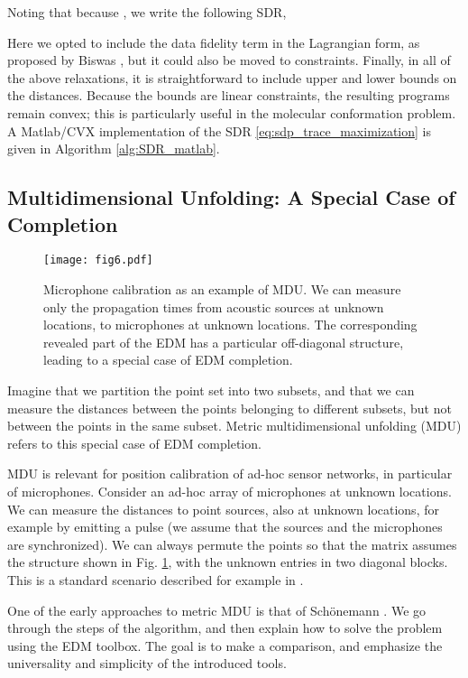 \documentclass[10pt,double]{IEEEtran}
\begin{document}
Noting that  because , we write the following SDR,

Here we opted to include the data fidelity term in the Lagrangian form, as
proposed by Biswas
\cite{Biswas:2006cm}, but it could also be moved to constraints. Finally, in all of
the above relaxations, it is straightforward to include upper and lower bounds
on the distances. Because the bounds are linear constraints, the resulting
programs remain convex; this is particularly useful in the molecular
conformation problem. A Matlab/CVX \cite{cvx,gb08} implementation of the SDR
\eqref{eq:sdp_trace_maximization} is given in Algorithm \ref{alg:SDR_matlab}.



\subsection{Multidimensional Unfolding: A Special Case of Completion} \label{sub:box_unfolding}

\begin{figure}
\centering
\texttt{[image: fig6.pdf]}
\caption{Microphone calibration as an example of MDU. We can measure only the
propagation times from acoustic sources at unknown locations, to microphones
at unknown locations. The corresponding revealed part of the EDM has a
particular off-diagonal structure, leading to a special case of EDM
completion.}
\label{fig:mdu}
\end{figure}

Imagine that we partition the point set into two subsets, and that we can
measure the distances between the points belonging to different subsets, but
not between the points in the same subset. Metric multidimensional unfolding (MDU)
\cite{Schonemann:1970wd} refers to this special case of EDM completion. 

MDU is relevant for position calibration of ad-hoc sensor networks, in
particular of microphones. Consider an ad-hoc array of  microphones at
unknown locations. We can measure the distances to  point sources, also at
unknown locations, for example by emitting a pulse (we assume that the sources
and the microphones are synchronized). We can always permute the points so
that the matrix assumes the structure shown in Fig. \ref{fig:mdu}, with the
unknown entries in two diagonal blocks. This is a standard scenario described
for example in \cite{Crocco:2012eu}.

One of the early approaches to metric MDU is that of Sch\"onemann
\cite{Schonemann:1970wd}. We go through the steps of the algorithm, and then
explain how to solve the problem using the EDM toolbox. The goal is to make a
comparison, and emphasize the universality and simplicity of the introduced
tools.
\end{document}
